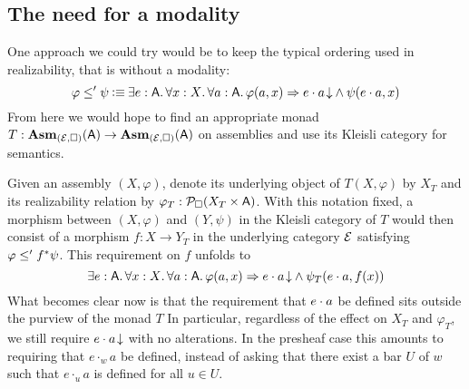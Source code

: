 \documentclass[11pt]{article}
\begin{document}

\subsection{The need for a modality}

One approach we could try would be to keep the typical ordering
used in realizability, that is without a modality:
%
\[
    \varphi \leq' \psi
    \IsDefined
    \IExists{e : \A}{
      \IForall{x : \X}{
        \IForall{a : \A}{
          \IImplies%
            {\varphi(a,x)}%
            {\IAnd%
              {\ITotal{\IAp{e}{a}}}%
              {\psi(\IAp{e}{a}, x)}
            }
        }
      }
    }
\]
%
From here we would hope to find an appropriate monad \(T : \mathbf{Asm}_{(\mathcal{E},\Box)}(\mathsf{A}) \to \mathbf{Asm}_{(\mathcal{E},\Box)}(\mathsf{A})\)
on assemblies and use its Kleisli category for semantics.

Given an assembly \((X,\varphi)\), denote its underlying
object of \(T(X,\varphi)\) by \(X_{T}\) and its realizability relation
by \(\varphi_{T}:\mathcal{P}_{\Box}{({X_{T}}\times{\ensuremath{\mathsf{A}}})}\).
%
With this notation fixed, a morphism between \((X,\varphi)\) and \((Y,\psi)\) in
the Kleisli category of \(T\) would then consist of a morphism
\(f : X \to Y_{T}\) in the underlying category \(\mathcal{E}\) satisfying
\(\varphi \leq' {f}^\ast\psi\).
%
This requirement on \(f\) unfolds to
%
\[
  \IExists{e : \A}{
    \IForall{x : \X}{
      \IForall{a : \A}{
        \IImplies%
          {\varphi(a,x)}%
          {\IAnd%
            {\ITotal{\IAp{e}{a}}}%
            {\psi_{T}(\IAp{e}{a}, f(x))}
          }
      }
    }
  }
\]
%
What becomes clear now is that the requirement that \({e}\cdot{a}\)
be defined sits outside the purview of the monad \(T\)
%
In particular, regardless of the effect on \(X_{T}\) and \(\varphi_{T}\), we
still require \({{{e}\cdot{a}}\!\downarrow}\) with no alterations.
%
In the presheaf case this amounts to requiring that \({e}\cdot_{w}{a}\)
be defined, instead of asking that there exist a bar \(U\) of \(w\)
such that \({e}\cdot_{u}{a}\) is defined for all \(u \in U\).
\end{document}
